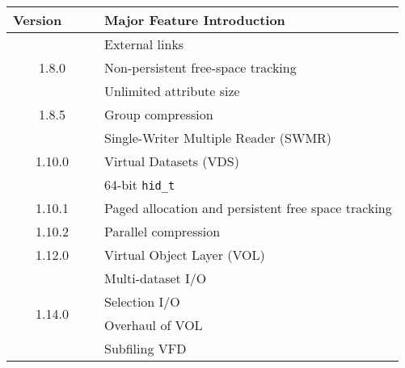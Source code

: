 \begin{center}
\begin{tabular}{|c|l|}
\hline 
\textbf{Version}~~~~ & \textbf{Major Feature Introduction}\tabularnewline
\hline 
\hline 
\multirow{3}{*}{1.8.0} & External links\tabularnewline
\cline{2-2} 
 & Non-persistent free-space tracking\tabularnewline
\cline{2-2} 
 & Unlimited attribute size\tabularnewline
\hline 
1.8.5 & Group compression\tabularnewline
\hline 
\multirow{3}{*}{1.10.0} & Single-Writer Multiple Reader (SWMR)\tabularnewline
\cline{2-2} 
 & Virtual Datasets (VDS)\tabularnewline
\cline{2-2} 
 & 64-bit \texttt{hid\_t}\tabularnewline
\hline 
1.10.1 & Paged allocation and persistent free space tracking\tabularnewline
\hline 
1.10.2 & Parallel compression\tabularnewline
\hline 
1.12.0 & Virtual Object Layer (VOL)\tabularnewline
\hline 
\multirow{4}{*}{1.14.0} & Multi-dataset I/O\tabularnewline
\cline{2-2} 
 & Selection I/O\tabularnewline
\cline{2-2} 
 & Overhaul of VOL \tabularnewline
\cline{2-2} 
 & Subfiling VFD\tabularnewline
\hline 
\end{tabular}
\end{center}